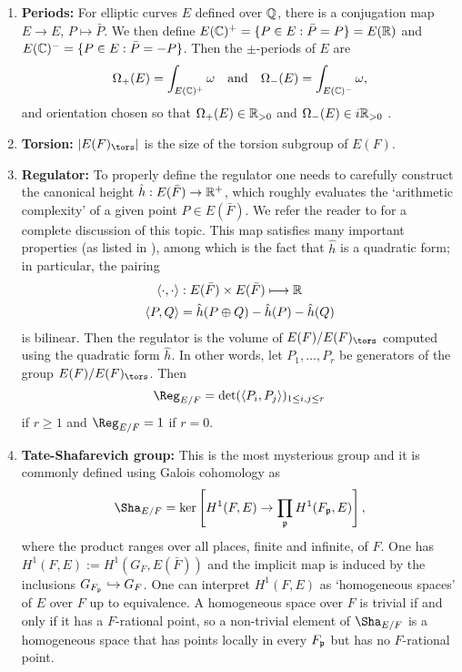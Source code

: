 \begin{enumerate}
    \item \textbf{Periods: } For elliptic curves $E$ defined over $\mathbb{Q}$, there is a conjugation map $E\to E$, $P\mapsto\bar{P}$. We then define $E(\mathbb{C})^+=\{P\in E:\bar{P}=P\}=E(\mathbb{R})$ and $E(\mathbb{C})^-=\{P\in E:\bar{P}=-P\}$. Then the $\pm$-periods of $E$ are 
    $$\Omega_+(E)=\int_{E(\mathbb{C})^+}\omega \quad\text{and}\quad\Omega_-(E)=\int_{E(\mathbb{C})^-}\omega,$$
    and orientation chosen so that $\Omega_+(E)\in\mathbb{R}_{>0}$ and $\Omega_-(E)\in i\mathbb{R}_{>0}$ .
    \item \textbf{Torsion:} $|E(F)_{\tors}|$ is the size of the torsion subgroup of $E(F)$.
    \item \textbf{Regulator:} To properly define the regulator one needs to carefully construct the canonical height $\hat{h}:E(\bar{F})\rightarrow\mathbb{R}^+$, which roughly evaluates the `arithmetic complexity' of a given point $P\in E(\bar{F})$. We refer the reader to \cite[Chapter VIII: \S4, \S5, \S6 and \S9]{S1} for a complete discussion of this topic. This map satisfies many important properties (as listed in \cite[Chapter VIII, Theorem 9.3]{S1}), among which is the fact that $\hat{h}$ is a quadratic form; in particular, the pairing
    \begin{align*}
        \langle\cdot,\cdot\rangle&:E(\bar{F})\times E(\bar{F})\longmapsto\mathbb{R}\\
        \langle P,Q\rangle&=\hat{h}(P\oplus Q)-\hat{h}(P)-\hat{h}(Q)
    \end{align*}
    is bilinear. Then the regulator is the volume of $E(F)/E(F)_{\tors}$ computed using the quadratic form $\hat{h}$. In other words, let $P_1,\ldots,P_r$ be generators of the group $E(F)/E(F)_{\tors}$. Then $$\Reg_{E/F}=\det(\langle P_i,P_j\rangle)_{1\leq i,j\leq r}$$
    if $r\geq1$ and $\Reg_{E/F}=1$ if $r=0$.
    \item \textbf{Tate-Shafarevich group:} This is the most mysterious group and it is commonly defined using Galois cohomology as
    $$\Sha_{E/F}=\ker\left[H^1(F,E)\rightarrow\prod_{\pp}H^1(F_\pp,E)\right],$$
    where the product ranges over all places, finite and infinite, of $F$. One has $H^1(F,E):=H^1(G_F,E(\bar{F}))$ and the implicit map is induced by the inclusions $G_{F_{\mathfrak{p}}}\hookrightarrow G_F$. One can interpret $H^1(F,E)$ as `homogeneous spaces' of $E$ over $F$ up to equivalence. A homogeneous space over $F$ is trivial if and only if it has a $F$-rational point, so a non-trivial element of $\Sha_{E/F}$ is a homogeneous space that has points locally in every $F_{\mathfrak{p}}$ but has no $F$-rational point.


\end{enumerate}
